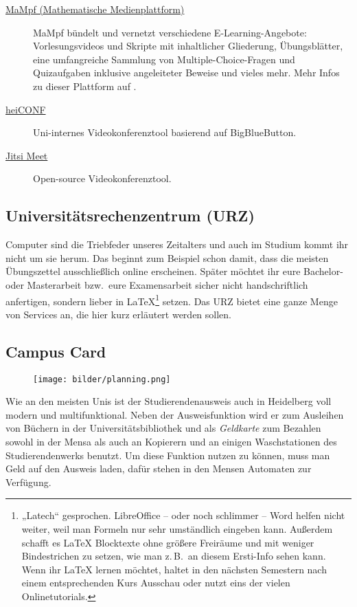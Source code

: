 \begin{description}
	\item[\href{https://mampf.mathi.uni-heidelberg.de}{MaMpf (Mathematische Medienplattform)}]
    MaMpf bündelt und vernetzt verschiedene E-Learning-Angebote: Vorlesungsvideos und Skripte mit inhaltlicher Gliederung, Übungsblätter, eine umfangreiche Sammlung von Multiple-Choice-Fragen und Quizaufgaben inklusive angeleiteter Beweise und vieles mehr. Mehr Infos zu dieser Plattform auf .

	\item[\href{https://heiconf.uni-heidelberg.de}{heiCONF}]
    Uni-internes Videokonferenztool basierend auf BigBlueButton.

	\item[\href{https://meet.jit.si/}{Jitsi Meet}]
    Open-source Videokonferenztool.
\end{description}


\subsection{Universitätsrechenzentrum (URZ)}
\label{urz}
Computer sind die Triebfeder unseres Zeitalters und auch im Studium kommt ihr nicht um sie herum. Das beginnt zum Beispiel schon damit, dass die meisten Übungszettel ausschließlich online erscheinen. Später möchtet ihr eure Bachelor- oder Masterarbeit bzw.\ eure Examensarbeit sicher nicht handschriftlich anfertigen, sondern lieber in \LaTeX \footnote{„Latech“ gesprochen. LibreOffice -- oder noch schlimmer -- Word helfen nicht weiter, weil man Formeln nur sehr umständlich eingeben kann. Außerdem schafft es \LaTeX{} Blocktexte ohne größere Freiräume und mit weniger Bindestrichen zu setzen, wie man z.\,B.\ an diesem Ersti-Info sehen kann. Wenn ihr \LaTeX{} lernen möchtet, haltet in den nächsten Semestern nach einem entsprechenden Kurs Ausschau oder nutzt eins der vielen Onlinetutorials.} setzen. Das \gls{URZ} bietet eine ganze Menge von Services an, die hier kurz erläutert werden sollen.

\subsection{Campus Card}
\label{campuscard}

\begin{figure}[b]
    \centering
    \texttt{[image: bilder/planning.png]}
\end{figure}

Wie an den meisten Unis ist der Studierendenausweis auch in Heidelberg voll modern und multifunktional. Neben der Ausweisfunktion wird er zum Ausleihen von Büchern in der Universitätsbibliothek und als \emph{Geldkarte} zum Bezahlen sowohl in der Mensa als auch an Kopierern und an einigen Waschstationen des Studierendenwerks benutzt. Um diese Funktion nutzen zu können, muss man Geld auf den Ausweis laden, dafür stehen in den Mensen Automaten zur Verfügung.

